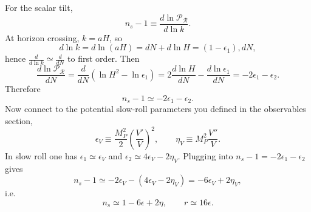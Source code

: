 For the scalar tilt,  
$$
n_s-1 \equiv \frac{d\ln \mathcal P_\mathcal R}{d\ln k}.  
$$
At horizon crossing, $k=aH$, so  
$$
d\ln k = d\ln(aH)= dN + d\ln H = (1-\epsilon_1),dN,  
$$
hence $ \frac{d}{d\ln k}\simeq \frac{d}{dN}$ to first order. Then  
$$
\frac{d\ln \mathcal P_\mathcal R}{dN}  
= \frac{d}{dN}\left(\ln H^2 - \ln\epsilon_1\right)  
= 2\frac{d\ln H}{dN} - \frac{d\ln \epsilon_1}{dN}  
= -2\epsilon_1 - \epsilon_2.  
$$
Therefore  
$$
\boxed{n_s-1 \simeq -2\epsilon_1-\epsilon_2.} 
$$
Now connect to the potential slow-roll parameters you defined in the observables section,  
$$
\epsilon_V\equiv \frac{M_P^2}{2}\left(\frac{V'}{V}\right)^2,\qquad  
\eta_V\equiv M_P^2\frac{V''}{V}.
$$
In slow roll one has $\epsilon_1\simeq \epsilon_V$ and $\epsilon_2 \simeq 4\epsilon_V-2\eta_V$. Plugging into $n_s-1=-2\epsilon_1-\epsilon_2$ gives  
$$
n_s-1 \simeq -2\epsilon_V-(4\epsilon_V-2\eta_V)= -6\epsilon_V+2\eta_V,  
$$
i.e.  
$$
\boxed{n_s \simeq 1-6\epsilon+2\eta,\qquad r\simeq 16\epsilon.}  
$$
